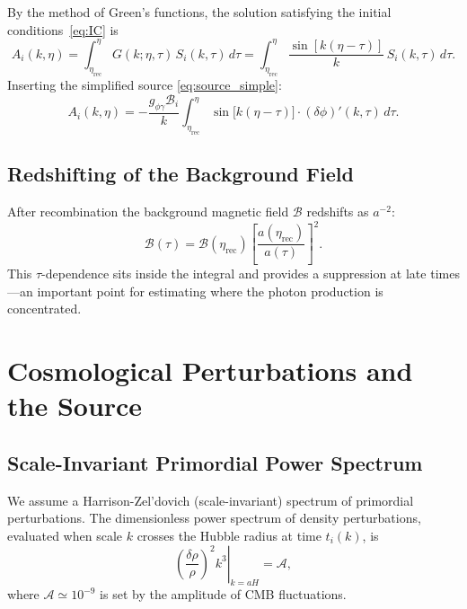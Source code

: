 \documentclass[12pt,a4paper]{report}
\newcommand{\gag}{g_{\phi\gamma}}
\theoremstyle{definition}
\begin{document}
By the method of Green's functions, the solution satisfying the initial
conditions~\eqref{eq:IC} is
\begin{equation}
  \boxed{A_i(k,\eta) = \int_{\eta_{\mathrm{rec}}}^\eta G(k;\eta,\tau)\,S_i(k,\tau)\,d\tau
  = \int_{\eta_{\mathrm{rec}}}^\eta \frac{\sin[k(\eta-\tau)]}{k}\,S_i(k,\tau)\,d\tau.}
  \label{eq:sol}
\end{equation}
Inserting the simplified source \eqref{eq:source_simple}:
\begin{equation}
  A_i(k,\eta) = -\frac{\gag\mathcal{B}_i}{k}
  \int_{\eta_{\mathrm{rec}}}^\eta
  \sin\!\bigl[k(\eta-\tau)\bigr]\cdot(\delta\phi)'(k,\tau)\,d\tau.
  \label{eq:sol_explicit}
\end{equation}

\section{Redshifting of the Background Field}

After recombination the background magnetic field $\mathcal{B}$ redshifts as
$a^{-2}$:
\begin{equation}
  \mathcal{B}(\tau) = \mathcal{B}(\eta_{\mathrm{rec}})\left[\frac{a(\eta_{\mathrm{rec}})}{a(\tau)}\right]^2.
\end{equation}
This $\tau$-dependence sits inside the integral and provides a suppression at
late times---an important point for estimating where the photon production is
concentrated.

\chapter{Cosmological Perturbations and the Source}

\section{Scale-Invariant Primordial Power Spectrum}

We assume a Harrison-Zel'dovich (scale-invariant) spectrum of primordial perturbations.
The dimensionless power spectrum of density perturbations, evaluated when scale $k$
crosses the Hubble radius at time $t_i(k)$, is
\begin{equation}
  \left.\left(\frac{\delta\rho}{\rho}\right)^2 k^3\right|_{k=aH}= \mathcal{A},
  \label{eq:scale_inv}
\end{equation}
where $\mathcal{A}\simeq 10^{-9}$ is set by the amplitude of CMB fluctuations.
\end{document}
